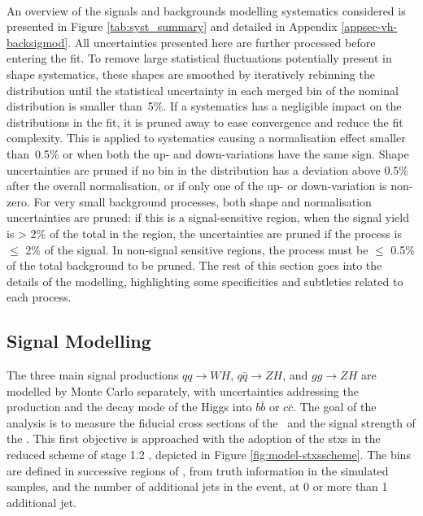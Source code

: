 \paragraph{}An overview of the signals and backgrounds modelling systematics considered is presented in Figure \ref{tab:syst_summary} and detailed in Appendix \ref{appsec-vh-backsigmod}. All uncertainties presented here are further processed before entering the fit. To remove large statistical fluctuations potentially present in shape systematics, these shapes are smoothed by iteratively rebinning the distribution until the statistical uncertainty in each merged bin of the nominal distribution is smaller than~5\%. If a systematics has a negligible impact on the distributions in the fit, it is pruned away to ease convergence and reduce the fit complexity. This is applied to systematics causing a normalisation effect smaller than~0.5\% or when both the up- and down-variations have the same sign. Shape uncertainties are pruned if no bin in the distribution has a deviation above 0.5\% after the overall normalisation, or if only one of the up- or down-variation is non-zero. For very small background processes, both shape and normalisation uncertainties are pruned: if this is a signal-sensitive region, when the signal yield is > 2\% of the total in the region, the uncertainties are pruned if the process is $\leq$ 2\% of the signal. In non-signal sensitive regions, the process must be $\leq$ 0.5\% of the total background to be pruned. The rest of this section goes into the details of the modelling, highlighting some specificities and subtleties related to each process. 

\subsection{Signal Modelling}\label{sec-modSignal}
The three main signal productions $qq \rightarrow WH$, $q\bar{q} \rightarrow ZH$, and $gg \rightarrow ZH$ are modelled by Monte Carlo separately, with uncertainties addressing the production and the decay mode of the Higgs into $b\bar{b}$ or $c\bar{c}$. The goal of the analysis is to measure the fiducial cross sections of the \vhb\ and the signal strength of the \vhc. This first objective is approached with the adoption of the \gls{stxs} in the reduced scheme of stage 1.2 \cite{badger2016les, berger2019simplified}, depicted in Figure \ref{fig:model-stxsscheme}. The bins are defined in successive regions of \ptv, from truth information in the simulated samples, and the number of additional jets in the event, at 0 or more than 1 additional jet.
  
